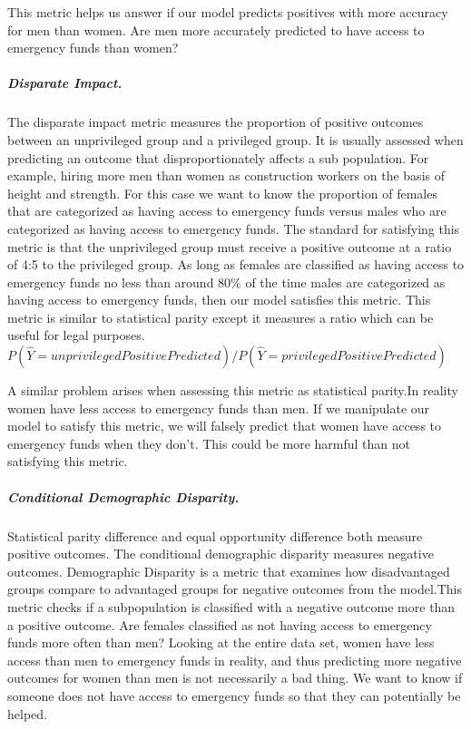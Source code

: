 \documentclass[water,article,submit,moreauthors,pdftex]{mdpi}
\begin{document}
This metric helps us answer if our model predicts positives with more
accuracy for men than women. Are men more accurately predicted to have
access to emergency funds than women?

\hypertarget{disparate-impact.}{%
\subparagraph{Disparate Impact.}\label{disparate-impact.}}

The disparate impact metric measures the proportion of positive outcomes
between an unprivileged group and a privileged group. It is usually
assessed when predicting an outcome that disproportionately affects a
sub population. For example, hiring more men than women as construction
workers on the basis of height and strength. For this case we want to
know the proportion of females that are categorized as having access to
emergency funds versus males who are categorized as having access to
emergency funds. The standard for satisfying this metric is that the
unprivileged group must receive a positive outcome at a ratio of 4:5 to
the privileged group. As long as females are classified as having access
to emergency funds no less than around 80\% of the time males are
categorized as having access to emergency funds, then our model
satisfies this metric.\citep{caton2020fairness} This metric is similar
to statistical parity except it measures a ratio which can be useful for
legal purposes.
\(P(\hat{Y}=unprivilegedPositivePredicted) /P(\hat{Y}=privilegedPositivePredicted)\)

A similar problem arises when assessing this metric as statistical
parity.In reality women have less access to emergency funds than men. If
we manipulate our model to satisfy this metric, we will falsely predict
that women have access to emergency funds when they don't. This could be
more harmful than not satisfying this metric.

\hypertarget{conditional-demographic-disparity.}{%
\subparagraph{Conditional Demographic
Disparity.}\label{conditional-demographic-disparity.}}

Statistical parity difference and equal opportunity difference both
measure positive outcomes. The conditional demographic disparity
measures negative outcomes. Demographic Disparity is a metric that
examines how disadvantaged groups compare to advantaged groups for
negative outcomes from the model.This metric checks if a subpopulation
is classified with a negative outcome more than a positive outcome. Are
females classified as not having access to emergency funds more often
than men? Looking at the entire data set, women have less access than
men to emergency funds in reality, and thus predicting more negative
outcomes for women than men is not necessarily a bad thing. We want to
know if someone does not have access to emergency funds so that they can
potentially be helped.
\end{document}
